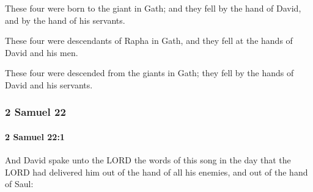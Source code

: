 			\begin{versebox}
					\item[BHS] 
					\item[ASV] These four were born to the giant in Gath; and they fell by the hand of David, and by the hand of his servants.
					\item[NIV] These four were descendants of Rapha in Gath, and they fell at the hands of David and his men.
					\item[NRSV] These four were descended from the giants in Gath; they fell by the hands of David and his servants.
			\end{versebox}
	\subsubsection{2 Samuel 22} %
		\label{2SAMUEL-22}

		\paragraph{2 Samuel 22:1} %
			\label{2SAMUEL-22-1}

			And David spake unto the LORD the words of this song in the day that the LORD had delivered him out of the hand of all his enemies, and out of the hand of Saul:

